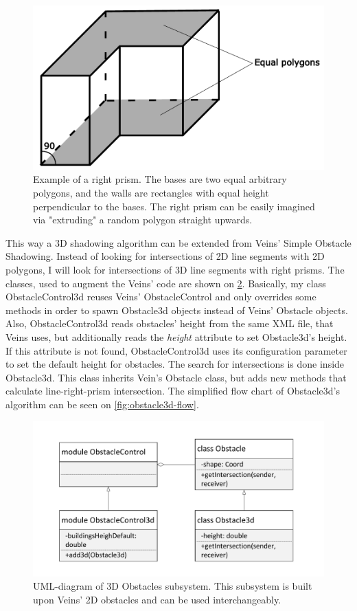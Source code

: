 \documentclass[]{nsm-thesis}
\begin{document}
\begin{figure}
	\centering
	\includegraphics[width=1\textwidth]{figures/RightPrism.pdf}
	\caption{Example of a right prism. The bases are two equal arbitrary polygons, and the walls are rectangles with equal height perpendicular to the bases. The right prism can be easily imagined via "extruding" a random polygon straight upwards.}
	\label{fig:rightprism}
\end{figure}

This way a 3D shadowing algorithm can be extended from Veins' Simple Obstacle Shadowing. Instead of looking for intersections of 2D line segments with 2D polygons, I will look for intersections of 3D line segments with right prisms. The classes, used to augment the Veins' code are shown on \cref{fig:obstacle3d-classes}. Basically, my class ObstacleControl3d reuses Veins' ObstacleControl and only overrides some methods in order to spawn Obstacle3d objects instead of Veins' Obstacle objects. Also, ObstacleControl3d reads obstacles' height from the same XML file, that Veins uses, but additionally reads the \emph{height} attribute to set Obstacle3d's height. If this attribute is not found, ObstacleControl3d uses its configuration parameter to set the default height for obstacles. The search for intersections is done inside Obstacle3d. This class inherits Vein's Obstacle class, but adds new methods that calculate line-right-prism intersection. The simplified flow chart of Obstacle3d's algorithm can be seen on \cref{fig:obstacle3d-flow}. 

\begin{figure}
	\centering
	\includegraphics[width=1\textwidth]{figures/Obstacle3d-classes.pdf}
	\caption{UML-diagram of 3D Obstacles subsystem. This subsystem is built upon Veins' 2D obstacles and can be used interchangeably.}
	\label{fig:obstacle3d-classes}
\end{figure}
\end{document}
